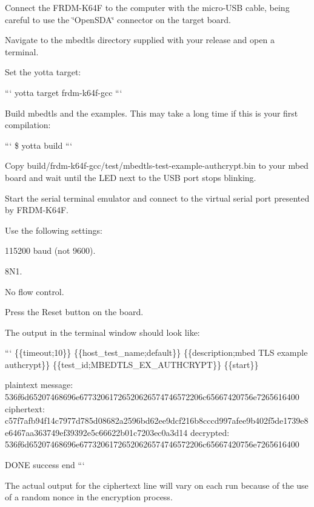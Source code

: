 \begin{DoxyEnumerate}
\item Connect the F\-R\-D\-M-\/\-K64\-F to the computer with the micro-\/\-U\-S\-B cable, being careful to use the \char`\"{}\-Open\-S\-D\-A\char`\"{} connector on the target board.
\item Navigate to the mbedtls directory supplied with your release and open a terminal.
\item Set the yotta target\-:

``` yotta target frdm-\/k64f-\/gcc ```
\item Build mbedtls and the examples. This may take a long time if this is your first compilation\-:

``` \$ yotta build ```
\item Copy {\ttfamily build/frdm-\/k64f-\/gcc/test/mbedtls-\/test-\/example-\/authcrypt.\-bin} to your mbed board and wait until the L\-E\-D next to the U\-S\-B port stops blinking.
\item Start the serial terminal emulator and connect to the virtual serial port presented by F\-R\-D\-M-\/\-K64\-F.

Use the following settings\-:
\begin{DoxyItemize}
\item 115200 baud (not 9600).
\item 8\-N1.
\item No flow control.
\end{DoxyItemize}
\item Press the Reset button on the board.
\item The output in the terminal window should look like\-:

``` \{\{timeout;10\}\} \{\{host\-\_\-test\-\_\-name;default\}\} \{\{description;mbed T\-L\-S example authcrypt\}\} \{\{test\-\_\-id;M\-B\-E\-D\-T\-L\-S\-\_\-\-E\-X\-\_\-\-A\-U\-T\-H\-C\-R\-Y\-P\-T\}\} \{\{start\}\}
\end{DoxyEnumerate}

\begin{DoxyVerb}plaintext message: 536f6d65207468696e67732061726520626574746572206c65667420756e7265616400
ciphertext: c57f7afb94f14c7977d785d08682a2596bd62ee9dcf216b8cccd997afee9b402f5de1739e8e6467aa363749ef39392e5c66622b01c7203ec0a3d14
decrypted: 536f6d65207468696e67732061726520626574746572206c65667420756e7265616400

DONE
{{success}}
{{end}}
```
\end{DoxyVerb}


The actual output for the ciphertext line will vary on each run because of the use of a random nonce in the encryption process. 